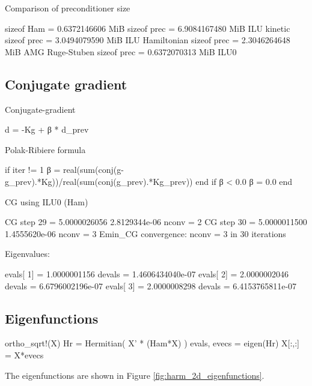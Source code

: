 Comparison of preconditioner size
\begin{textcode}
sizeof Ham  =       0.6372146606 MiB
sizeof prec =       6.9084167480 MiB  ILU kinetic
sizeof prec =       3.0494079590 MiB  ILU Hamiltonian
sizeof prec =       2.3046264648 MiB  AMG Ruge-Stuben
sizeof prec =       0.6372070313 MiB  ILU0
\end{textcode}


\subsection{Conjugate gradient}

Conjugate-gradient

\begin{textcode}
d = -Kg + β * d_prev
\end{textcode}

Polak-Ribiere formula
\begin{juliacode}
if iter != 1
  β = real(sum(conj(g-g_prev).*Kg))/real(sum(conj(g_prev).*Kg_prev))
end
if β < 0.0 β = 0.0 end
\end{juliacode}

CG using ILU0 (Ham)
\begin{textcode}
CG step       29 =       5.0000026056   2.8129344e-06  nconv =     2
CG step       30 =       5.0000011500   1.4555620e-06  nconv =     3
Emin_CG convergence: nconv =     3 in    30 iterations
  
Eigenvalues:
  
evals[  1] =       1.0000001156 devals =   1.4606434040e-07
evals[  2] =       2.0000002046 devals =   6.6796002196e-07
evals[  3] =       2.0000008298 devals =   6.4153765811e-07  
\end{textcode}

\subsection{Eigenfunctions}

\begin{juliacode}
ortho_sqrt!(X)
Hr = Hermitian( X' * (Ham*X) )
evals, evecs = eigen(Hr)
X[:,:] = X*evecs
\end{juliacode}

The eigenfunctions are shown in Figure \ref{fig:harm_2d_eigenfunctions}.

